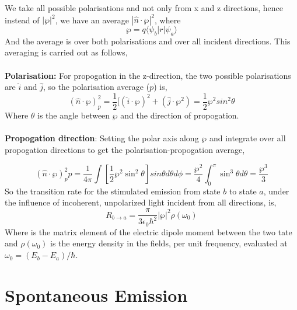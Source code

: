 We take all possible polarisations and not only from x and z directions, hence instead of $|\wp|^2$, we have an average $|\hat{n}\cdot\bm{\wp}|^2$, where
\begin{equation}
	\bm{\wp}=q\langle\psi_b|r|\psi_a\rangle
\end{equation}	
And the average is over both polarisations and over all incident directions. This averaging is carried out as follows,\\
\\
\textbf{Polarisation:} For propogation in the z-direction, the two possible polarisations are $\hat{i}$ and $\hat{j}$, so the polarisation average ($p$) is,
\begin{equation}
	(\hat{n}\cdot\bm{\wp})^2_p=\frac{1}{2}[	(\hat{i}\cdot\bm{\wp})^2+ 	(\hat{j}\cdot\bm{\wp}^2)=\frac{1}{2}\wp^2 sin^2\theta 
\end{equation}
Where $\theta$ is the angle between $\bm{\wp}$ and the direction of propogation.\\
\\
\textbf{Propogation direction}:	Setting the polar axis along $\bm{\wp}$ and integrate over all propogation directions to get the polarisation-propogation average,

\begin{equation}
	(\hat{n}\cdot\bm{\wp})^2_pp=\frac{1}{4\pi}\int\left[\frac{1}{2}\wp^2 \sin^2\theta\right]sin\theta d\theta d\phi=\frac{\wp^2}{4}\int_{0}^{\pi}\sin^3\theta d\theta=\frac{\wp^3}{3} 
\end{equation}
So the transition rate for the stimulated emission from state $b$ to state $a$, under the influence of incoherent, unpolarized light incident from all directions, is,
\begin{equation}
	R_{b\rightarrow a}=\frac{\pi}{3\epsilon_0\hbar^2}|\bm{\wp}|^2\rho(\omega_0)
\end{equation}
Where \bm{$\wp$} is the matrix element of the electric dipole moment between the two tate and $\rho(\omega_0)$ is the energy density in the fields, per unit frequency, evaluated at $\omega_0=(E_b-E_a)/\hbar$.

\section{Spontaneous Emission}
